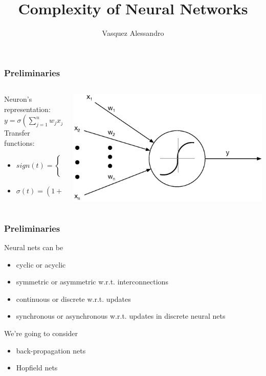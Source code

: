 \documentclass{beamer}
\title{Complexity of Neural Networks}
\author{Vasquez Alessandro}
\institute{Université Nice-Sophia-Antipolis}
\begin{document}
\frame{\titlepage}
\begin{frame}
\frametitle{Preliminaries}
\begin{columns}
	\begin{column}{0.47\textwidth}
		Neuron's representation:
		$y = \sigma (\sum_{j=1}^{n}w_jx_j - w_0)$ \\
		Transfer functions: 
		\begin{itemize}
			\item $   
			sign(t)  = 
			\begin{cases}
			0 &\quad\text{if } t \leq 0\\
			1 &\quad\text{if } t > 0 \\
			\end{cases}
			$
			\item $\sigma (t) = (1+e^{-t})^{-1}$
		\end{itemize}
	\end{column}
	\begin{column}{0.5\textwidth}
		\includegraphics[width=1.1 \textwidth]{images/neuron.eps}
	\end{column}
\end{columns}

\end{frame}


\begin{frame}
\frametitle{Preliminaries}
Neural nets can be
\begin{itemize}
	\item cyclic or acyclic
	\item symmetric or asymmetric w.r.t. interconnections
	\item continuous or discrete w.r.t. updates
	\item synchronous or asynchronous w.r.t. updates in discrete neural nets
\end{itemize}
We're going to consider
\begin{itemize}
	\item back-propagation nets
	\item Hopfield nets
\end{itemize}
\end{frame}
\end{document}
